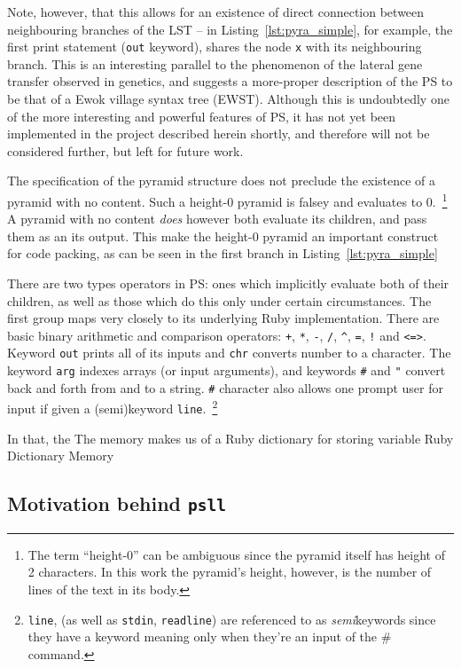 \documentclass[aip,jcp,reprint]{revtex4-1}
\let\tt\texttt
\newcommand\psll{\texttt{psll}\xspace}
\begin{document}
Note, however, that this allows for an existence of direct connection between neighbouring branches of the LST -- in Listing~\ref{lst:pyra_simple}, for example, the first print statement (\tt{out} keyword), shares the node \tt{x} with its neighbouring branch. This is an interesting parallel to the phenomenon of the lateral gene transfer observed in genetics, and suggests a more-proper description of the PS to be that of a Ewok village syntax tree (EWST).\cite{keeling2008,smbc} Although this is undoubtedly one of the more interesting and powerful features of PS, it has not yet been implemented in the project described herein shortly, and therefore will not be considered further, but left for future work.

The specification of the pyramid structure does not preclude the existence of a pyramid with no content. Such a height-0 pyramid is falsey and evaluates to 0.~\footnote{The term \enquote{height-0} can be ambiguous since the pyramid itself has height of 2 characters. In this work the pyramid's height, however, is the number of lines of the text in its body.}~\cite{psnegation} A pyramid with no content \emph{does} however both evaluate its children, and pass them as an its output. This make the height-0 pyramid an important construct for code packing, as can be seen in the first branch in Listing~\ref{lst:pyra_simple}

There are two types operators in PS: ones which implicitly evaluate both of their children, as well as those which do this only under certain circumstances. The first group maps very closely to its underlying Ruby implementation. There are basic binary arithmetic and comparison operators: \tt{+}, \tt{*}, \tt{-}, \tt{/}, \tt{\^}, \tt{=}, \tt{!} and \tt{<=>}. Keyword \tt{out} prints all of its inputs and \tt{chr} converts number to a character. The keyword \tt{arg} indexes arrays (or input arguments), and keywords \tt{\#} and \tt{"} convert back and forth from and to a string. \tt{\#} character also allows one prompt user for input if given a (semi)keyword \tt{line}.~\footnote{\tt{line}, (as well as \tt{stdin}, \tt{readline}) are referenced to as \emph{semi}keywords since they have a keyword meaning only when they're an input of the \# command.}~\cite{pyra_git}



In that, the 
The memory makes us of a Ruby dictionary for storing variable
Ruby Dictionary Memory

\subsection{Motivation behind \psll}
\end{document}
